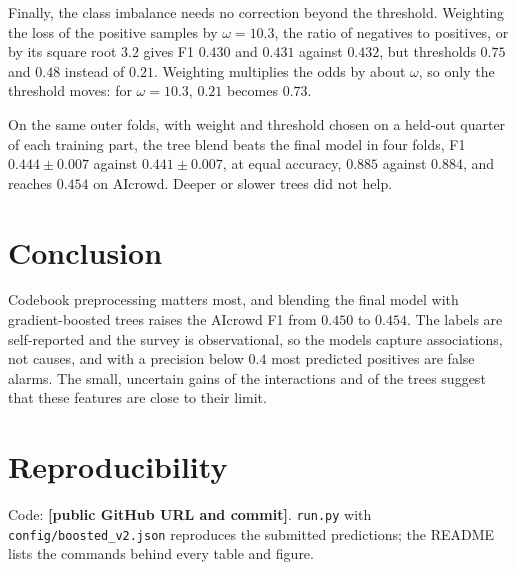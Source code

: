 \documentclass[10pt,conference,compsocconf]{IEEEtran}
\newcommand{\pending}[1]{\textbf{[#1]}}
\begin{document}
Finally, the class imbalance needs no correction beyond the threshold.
Weighting the loss of the positive samples by $\omega=10.3$, the ratio of
negatives to positives, or by its square root $3.2$ gives F1 $0.430$ and
$0.431$ against $0.432$, but thresholds $0.75$ and $0.48$ instead of
$0.21$. Weighting multiplies the odds by about $\omega$, so only the
threshold moves: for $\omega=10.3$, $0.21$ becomes $0.73$.

On the same outer folds, with weight and threshold chosen on a held-out
quarter of each training part, the tree blend beats the final model in four
folds, F1 $0.444\pm0.007$ against $0.441\pm0.007$, at equal accuracy,
$0.885$ against $0.884$, and reaches $0.454$ on AIcrowd. Deeper or slower
trees did not help.

\section{Conclusion}
Codebook preprocessing matters most, and blending the final model with
gradient-boosted trees raises the AIcrowd F1 from $0.450$ to $0.454$. The
labels are self-reported and the survey is observational, so the models
capture associations, not causes, and with a precision below $0.4$ most
predicted positives are false alarms. The small, uncertain gains of the
interactions and of the trees suggest that these features are close to
their limit.

\section*{Reproducibility}
Code: \pending{public GitHub URL and commit}. \texttt{run.py} with
\texttt{config/boosted\_v2.json} reproduces the submitted predictions; the
README lists the commands behind every table and figure.



\end{document}
